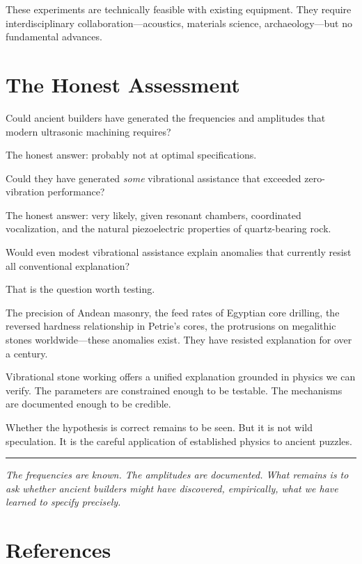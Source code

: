 \documentclass[11pt]{article}
\begin{document}
These experiments are technically feasible with existing equipment. They require interdisciplinary collaboration---acoustics, materials science, archaeology---but no fundamental advances.

\section{The Honest Assessment}

Could ancient builders have generated the frequencies and amplitudes that modern ultrasonic machining requires?

The honest answer: probably not at optimal specifications.

Could they have generated \textit{some} vibrational assistance that exceeded zero-vibration performance?

The honest answer: very likely, given resonant chambers, coordinated vocalization, and the natural piezoelectric properties of quartz-bearing rock.

Would even modest vibrational assistance explain anomalies that currently resist all conventional explanation?

That is the question worth testing.

The precision of Andean masonry, the feed rates of Egyptian core drilling, the reversed hardness relationship in Petrie's cores, the protrusions on megalithic stones worldwide---these anomalies exist. They have resisted explanation for over a century.

Vibrational stone working offers a unified explanation grounded in physics we can verify. The parameters are constrained enough to be testable. The mechanisms are documented enough to be credible.

Whether the hypothesis is correct remains to be seen. But it is not wild speculation. It is the careful application of established physics to ancient puzzles.

\vspace{2em}
\hrule
\vspace{1em}

\textit{The frequencies are known. The amplitudes are documented. What remains is to ask whether ancient builders might have discovered, empirically, what we have learned to specify precisely.}

\section*{References}


\end{document}
